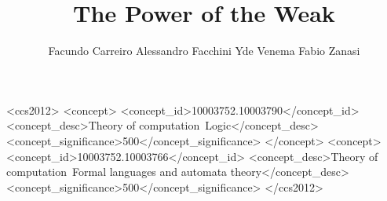 \documentclass[prodmode,acmtecs]{acmsmall} %
\begin{document}

\title{The Power of the Weak}

\author{
Facundo Carreiro
Alessandro Facchini
Yde Venema
Fabio Zanasi
}



%
%
 \begin{CCSXML}
<ccs2012>
<concept>
 <concept_id>10003752.10003790</concept_id>
 <concept_desc>Theory of computation~Logic</concept_desc>
 <concept_significance>500</concept_significance>
 </concept>
 <concept>
 <concept_id>10003752.10003766</concept_id>
 <concept_desc>Theory of computation~Formal languages and automata theory</concept_desc>
 <concept_significance>500</concept_significance>
</ccs2012>
\end{CCSXML}






\maketitle






\end{document}
